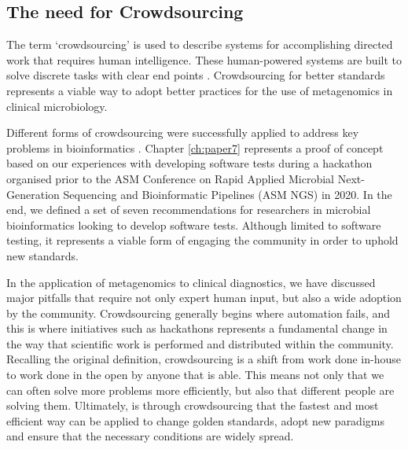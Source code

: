 \subsection{The need for Crowdsourcing}

The term ‘crowdsourcing’ is used to describe systems for accomplishing directed work that requires human intelligence. These human-powered systems are built to solve discrete tasks with clear end points \citep{good_crowdsourcing_2013}. Crowdsourcing for better standards represents a viable way to adopt better practices for the use of metagenomics in clinical microbiology.

Different forms of crowdsourcing were successfully applied to address key problems in bioinformatics \citep{good_crowdsourcing_2013, connor_ncbis_2019, powell_organizing_2021}. Chapter \ref{ch:paper7} represents a proof of concept based on our experiences with developing software tests during a hackathon organised prior to the ASM Conference on Rapid Applied Microbial Next-Generation Sequencing and Bioinformatic Pipelines (ASM NGS) in 2020. In the end, we defined a set of
seven recommendations for researchers in microbial bioinformatics looking to develop software tests. Although limited to software testing, it represents a viable form of engaging the community in order to uphold new standards.

In the application of metagenomics to clinical diagnostics, we have discussed major pitfalls that require not only expert human input, but also a wide adoption by the community. Crowdsourcing generally begins where automation fails, and this is where initiatives such as hackathons represents a fundamental change in the way that scientific work is performed and distributed within the community. Recalling the original definition, crowdsourcing is a shift from work done in-house to work done in the open by anyone that is able. This means not only that we can often solve more problems more efficiently, but also that different people are solving them. Ultimately, is through crowdsourcing that the fastest and most efficient way can be applied to change golden standards, adopt new paradigms and ensure that the necessary conditions are widely spread. 

